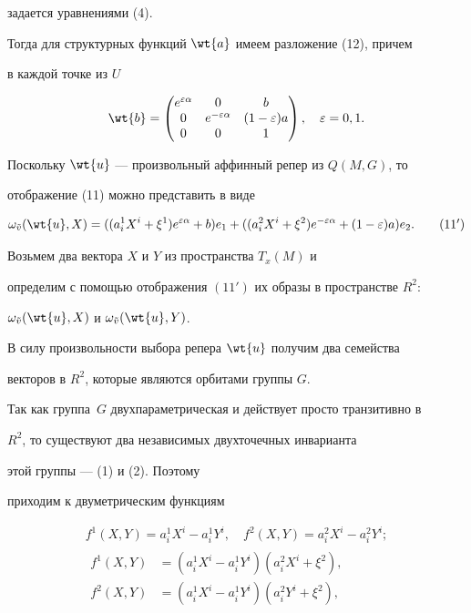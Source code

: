 задается уравнениями (4).


Тогда для структурных функций $\wt{a}$ имеем разложение (12), причем


в каждой точке из $U$


$$


\wt{b} =


\begin{pmatrix}


e^{\varepsilon\alpha}&0&b\\


0&e^{-\varepsilon\alpha}&(1-\varepsilon)a\\


0&0&1


\end{pmatrix}


,\quad \varepsilon=0,1.


$$





Поскольку $\wt{u}$ --- произвольный аффинный репер из $Q(M,G)$, то


отображение (11) можно представить в виде


\begin{equation}


\omega_{\Tilde{v}}(\wt{u},X)=((a_i^1X^i+\xi^1)e^{\varepsilon\alpha} +


b)e_1+((a_i^2X^i+\xi^2)e^{-\varepsilon\alpha}+(1-\varepsilon)a)e_2.


\tag{$11'$}


\end{equation}


Возьмем два вектора $X$ и $Y$ из пространства $T_x(M)$ и


определим с помощью отображения $(11')$ их образы в пространстве $R^2$:


$\omega_{\Tilde{v}}(\wt{u},X)$ и $\omega_{\Tilde{v}}(\wt{u},Y)$.


В силу произвольности выбора репера $\wt{u}$ получим два семейства


векторов в $R^2$, которые являются орбитами группы $G$.


Так как группа~$G$ двухпараметрическая и действует просто транзитивно в


$R^2$, то существуют два независимых двухточечных инварианта


этой группы --- (1) и (2). Поэтому 


приходим к двуметрическим функциям


\begin{gather}


f^1(X,Y)=a_i^1X^i - a_i^1Y^i,\quad


f^2(X,Y)=a_i^2X^i - a_i^2Y^i;\\


\begin{split}


f^1(X,Y)&=(a_i^1X^i - a_i^1Y^i)(a_i^2X^i+\xi^2),\\


f^2(X,Y)&=(a_i^1X^i - a_i^1Y^i)(a_i^2Y^i+\xi^2),


\end{split}


\end{gather}


